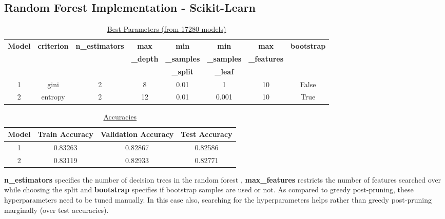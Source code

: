 \documentclass[12pt]{article}
\begin{document}
\subsection*{Random Forest Implementation - Scikit-Learn}
\vspace{-7mm}
\begin{table}[h!]
\begin{center}
\caption{\underline{Best Parameters (from 17280 models)}}
\vspace{1mm}
\label{tab:table2}
\begin{tabular}{|c|c|c|c|c|c|c|c|}
\hline
\textbf{Model} & \textbf{criterion} & \textbf{n\_estimators} & \textbf{max} & \textbf{min} & \textbf{min} & \textbf{max} & \textbf{bootstrap} \\
&  &  & \textbf{\_depth} & \textbf{\_samples} & \textbf{\_samples} & \textbf{\_features} & \\
&  &  &  & \textbf{\_split} & \textbf{\_leaf} &  & \\
\hline
1 & gini & 2 & 8 & 0.01 & 1 & 10 & False\\
2 & entropy & 2 & 12 & 0.01 & 0.001 & 10 & True\\
\hline
\end{tabular}
\end{center}
\end{table}
\begin{table}[h!]
\begin{center}
\caption{\underline{Accuracies}}
\vspace{1mm}
\label{tab:table3}
\begin{tabular}{|c|c|c|c|}
\hline
\textbf{Model} & \textbf{Train Accuracy} & \textbf{Validation Accuracy} & \textbf{Test Accuracy} \\
\hline
1 & 0.83263 & 0.82867 & 0.82586 \\
2 & 0.83119 & 0.82933 & 0.82771 \\
\hline
\end{tabular}
\end{center}
\end{table}
\vspace{-5mm}
\begin{addmargin}[0.3in]{0in}
\textbf{n\_estimators} specifies the number of decision trees in the random forest , \textbf{max\_features} restricts the number of features searched over while choosing the split and \textbf{bootstrap} specifies if bootstrap samples are used or not. As compared to greedy post-pruning, these hyperparameters need to be tuned manually. In this case also, searching for the hyperparameters helps rather than greedy post-pruning marginally (over test accuracies).
\end{addmargin}
\end{document}
